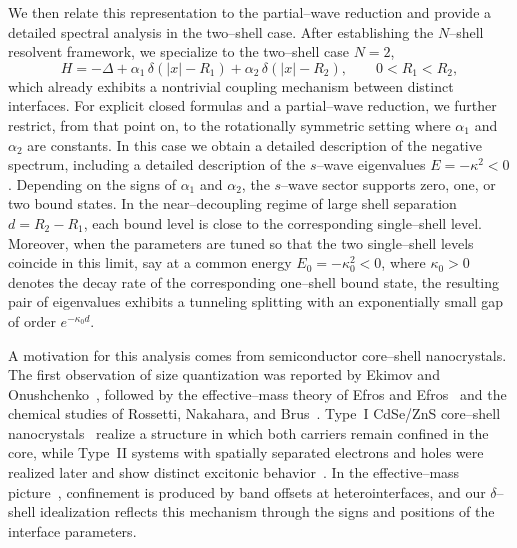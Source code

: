 \documentclass[a4paper,11pt]{article}
\numberwithin{equation}{section}
\theoremstyle{definition}
\theoremstyle{remark}
\begin{document}
We then relate this representation to the partial--wave reduction 
and provide a detailed spectral analysis in the two--shell case.
After establishing the $N$--shell resolvent framework, we specialize to the
two--shell case $N=2$,
\begin{equation}\label{eq:two-shell}
H
=
-\Delta
+
\alpha_1\,\delta(|x|-R_1)
+
\alpha_2\,\delta(|x|-R_2),
\qquad
0<R_1<R_2,
\end{equation}
which already exhibits a nontrivial coupling mechanism between distinct
interfaces.
For explicit closed formulas and a partial--wave reduction, we further restrict,
from that point on, to the rotationally symmetric setting where $\alpha_1$ and
$\alpha_2$ are constants.
In this case we obtain a detailed description of the negative spectrum,
including a detailed description of the $s$--wave eigenvalues $E=-\kappa^2<0$.
Depending on the signs of $\alpha_1$ and $\alpha_2$, the $s$--wave sector
supports zero, one, or two bound states.
In the near--decoupling regime of large shell separation $d=R_2-R_1$, each bound
level is close to the corresponding single--shell level.
Moreover, when the parameters are tuned so that the two single--shell levels
coincide in this limit, say at a common energy $E_0=-\kappa_0^2<0$, where
$\kappa_0>0$ denotes the decay rate of the corresponding one--shell bound
state, the resulting pair of eigenvalues exhibits a tunneling splitting with
an exponentially small gap of order $e^{-\kappa_0 d}$.

A motivation for this analysis comes from semiconductor core--shell nanocrystals.
The first observation of size quantization was reported by Ekimov and
Onushchenko~\cite{EkimovOnushchenko1981}, followed by the effective--mass theory
of Efros and Efros~\cite{EfrosEfros1982} and the chemical studies of Rossetti,
Nakahara, and Brus~\cite{Brus1983}.
Type~I CdSe/ZnS core--shell nanocrystals~\cite{HinesGuyotSionnest1996} realize a
structure in which both carriers remain confined in the core, while Type~II
systems with spatially separated electrons and holes were realized later and
show distinct excitonic behavior~\cite{Kim2003,OronKazesBanin2007}.
In the effective--mass picture~\cite{EfrosEfros1982}, confinement is produced by
band offsets at heterointerfaces, and our $\delta$--shell idealization reflects
this mechanism through the signs and positions of the interface parameters.
\end{document}
